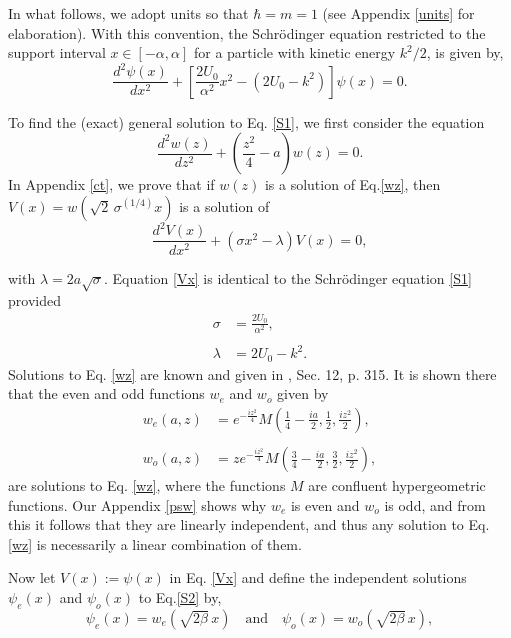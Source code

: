 \documentclass{article}
\numberwithin{equation}{section}
\begin{document}
In what follows, we adopt units so that $\hbar=m=1$ (see Appendix \ref{units} for elaboration).  With this convention, the Schr\"{o}dinger equation restricted to the support interval $x\in\left[-\alpha,\alpha\right]$ for a particle with kinetic energy  $k^2/2$, is given by,
\begin{equation}
\frac{d^2 \psi(x)}{dx^2}+\left[\frac{2U_0}{\alpha^2}x^2 -(2U_0-k^2)\right]\psi(x)=0.\label{S1}
\end{equation}
  
To find the (exact) general solution to Eq. \eqref{S1}, we first consider the equation
\begin{equation}
\frac{d^2w(z)}{dz^2}+\left(\frac{z^2}{4}-a\right)w(z)=0.\label{wz}
\end{equation}
In Appendix \ref{ct}, we prove that if $w(z)$ is a solution of Eq.\eqref{wz}, then $V(x)=w(\sqrt{2}\,\sigma^{(1/4)}x)$ is a solution of
\begin{equation}
\frac{d^2V(x)}{dx^2}+\left(\sigma x^2-\lambda\right)V(x)=0,\label{Vx}
\end{equation}

with $\lambda=2a\sqrt{\sigma}$.  Equation \eqref{Vx} is identical to the Schr\"odinger equation \eqref{S1} provided
\begin{align}
\sigma&=\frac{2U_0}{\alpha^2},\label{sigma}\\\nonumber\\
\lambda&=2U_0-k^2.\label{lambda}
\end{align}
Solutions to Eq. \eqref{wz} are known and given in \cite{OLBC10}, Sec. 12, p. 315.  It is shown there that the even and odd functions $w_e$ and $w_o$ given by
\begin{align}
w_e(a,z)&=e^{-\frac{iz^2}{4}}M\left(\frac{1}{4}-\frac{ia}{2},\frac{1}{2},\frac{iz^2}{2}\right),\label{we}\\\nonumber\\
w_o(a,z)&=ze^{-\frac{iz^2}{4}}M\left(\frac{3}{4}-\frac{ia}{2},\frac{3}{2},\frac{iz^2}{2}\right),\label{wo}
\end{align}
are solutions to Eq. \eqref{wz}, where the functions $M$ are confluent hypergeometric functions. Our Appendix \ref{psw} shows why $w_e$ is even and $w_o$ is odd, and from this it follows that they are linearly independent, and thus any solution to Eq. \eqref{wz} is necessarily a linear combination of them.

Now let $V(x):=\psi(x)$ in Eq. \eqref{Vx} and define the independent solutions $\psi_e(x)$ and $\psi_o(x)$ to Eq.\eqref{S2} by,
\begin{equation}
\psi_e(x) = w_e(\sqrt{2\beta}\,x)\quad \text{and}\quad \psi_o(x)=w_o(\sqrt{2\beta}\,x),\label{wewo}
\end{equation}
\end{document}
